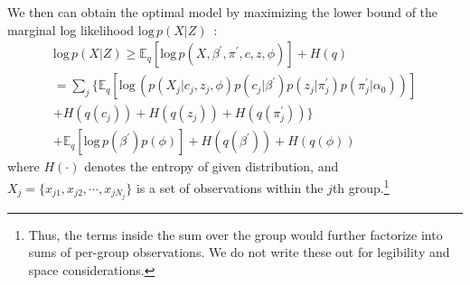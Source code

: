 \documentclass{article}
\begin{document}
We then can obtain the optimal model by maximizing the lower bound of the marginal log likelihood $\text{log}\,p(X|Z)$~\cite{bishop2006pattern, DBLP:journals/ml/JordanGJS99, 10.1214/06-BA104}:
\begin{equation}\label{eq:lowerbound}
\begin{aligned}
    \text{log}\, p(X|Z) \geq \mathbb{E}_{q}[\text{log}\,p(X, \beta^{\prime}, \pi^{\prime}, c, z, \phi)] + H(q) \\
    = \textstyle \sum_{j} \big\{ \mathbb{E}_{q}[\text{log}\,(p(X_{j}|c_{j}, z_{j}, \phi)p(c_{j}|\beta^{\prime})p(z_{j}|\pi_{j}^{\prime})p(\pi^{\prime}_{j}|\alpha_{0}))] \\
    + H(q(c_{j})) + H(q(z_{j})) + H(q(\pi^{\prime}_{j})) \big\} \\
    + \mathbb{E}_{q}[\text{log}\,p(\beta^{\prime})p(\phi)] + H(q(\beta^{\prime})) + H(q(\phi))
\end{aligned}
\end{equation}
where $H(\cdot)$ denotes the entropy of given distribution, and $X_{j} = \{x_{j1}, x_{j2}, \cdots, x_{jN_{j}}\}$ is a set of observations within the $j$th group.\footnote{
Thus, the terms inside the sum over the group would further factorize into sums of per-group observations. We do not write these out for legibility and space considerations.
}
\end{document}
